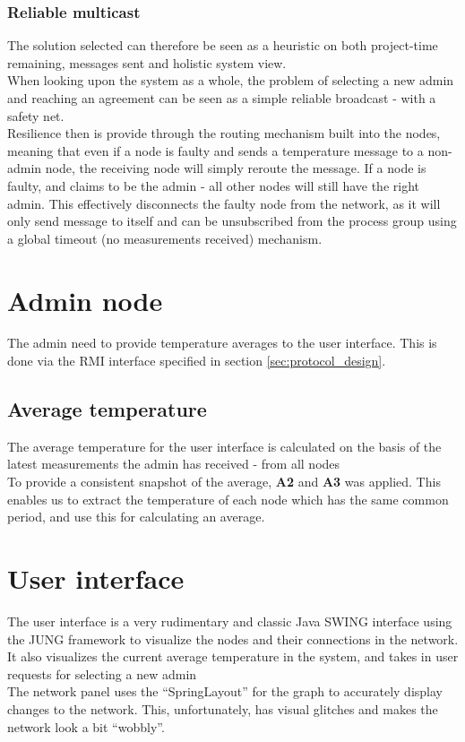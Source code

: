\documentclass[10pt,a4paper]{article}
\begin{document}
\subsubsection{Reliable multicast}
\label{sec:agreement_r_multicast}
The solution selected can therefore be seen as a heuristic on both project-time remaining, messages sent and holistic system view.\\
When looking upon the system as a whole, the problem of selecting a new admin and reaching an agreement can be seen as a simple reliable broadcast - with a safety net.\\
Resilience then is provide through the routing mechanism built into the nodes, meaning that even if a node is faulty and sends a temperature message to a non-admin node, the receiving node will simply reroute the message. If a node is faulty, and claims to be the admin - all other nodes will still have the right admin. This effectively disconnects the faulty node from the network, as it will only send message to itself and can be unsubscribed from the process group using a global timeout (no measurements received) mechanism.

\section{Admin node}
The admin need to provide temperature averages to the user interface. This is done via the  RMI interface specified in section \ref{sec:protocol_design}.
\subsection{Average temperature}
The average temperature for the user interface is calculated on the basis of the latest measurements the admin has received - from all nodes\\
To provide a consistent snapshot of the average, \textbf{A2} and \textbf{A3} was applied. This enables us to extract the temperature of each node which has the same common period, and use this for calculating an average.

\section{User interface}
The user interface is a very rudimentary and classic Java SWING interface using the JUNG framework to visualize the nodes and their connections in the network. It also visualizes the current average temperature in the system, and takes in user requests for selecting a new admin\\
The network panel uses the ``SpringLayout'' for the graph to accurately display changes to the network. This, unfortunately, has visual glitches and makes the network look a bit ``wobbly''.
\end{document}
